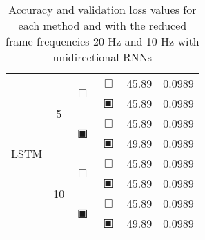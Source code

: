 \begin{table}[H]
\begin{tabular}{|c|c|c|c|c|c|}
		\hline\hline
		\multirow{8}{*}{LSTM}& \multirow{4}{*}{5} & \multirow{2}{*}{$\Box$} & $\Box$ & 45.89 & 0.0989\\\cline{4-6}
				    &                    &                         & $\blackinwhitesquare$ & 45.89 & 0.0989\\\cline{3-6}
				    &                    & \multirow{2}{*}{$\blackinwhitesquare$} & $\Box$ & 45.89 & 0.0989\\\cline{4-6}
				    &                    &                         & $\blackinwhitesquare$ & 49.89 & 0.0989\\\cline{2-6}
				    & \multirow{4}{*}{10} & \multirow{2}{*}{$\Box$} & $\Box$ & 45.89 & 0.0989\\\cline{4-6}
				    &                     &                         & $\blackinwhitesquare$ & 45.89 & 0.0989\\\cline{3-6}
				    &                     & \multirow{2}{*}{$\blackinwhitesquare$} & $\Box$ & 45.89 & 0.0989\\\cline{4-6}
				    &                     &                         & $\blackinwhitesquare$ & 49.89 & 0.0989\\\cline{2-6}
		\hline\hline
	\end{tabular}
	\caption{Accuracy and validation loss values for each method and with the reduced frame frequencies 20 Hz and 10 Hz with unidirectional RNNs}
	\label{tab:stats_frequency_seq}
\end{table}
